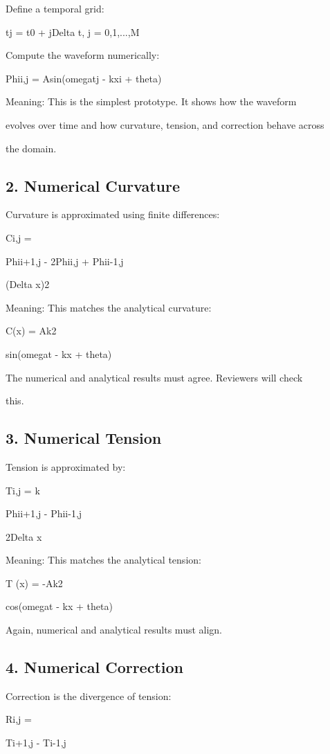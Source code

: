 \documentclass[10pt]{article}
\begin{document}
Define a temporal grid:


tj = t0 + jDelta t, j = 0,1,...,M

Compute the waveform numerically:

Phii,j = Asin(omegatj - kxi + theta)

Meaning: This is the simplest prototype. It shows how the waveform

evolves over time and how curvature, tension, and correction behave across

the domain.

\subsection*{2. Numerical Curvature}
Curvature is approximated using finite differences:

Ci,j =

Phii+1,j - 2Phii,j + Phii-1,j

(Delta x)2

Meaning: This matches the analytical curvature:

C(x) = Ak2

sin(omegat - kx + theta)

The numerical and analytical results must agree. Reviewers will check

this.

\subsection*{3. Numerical Tension}
Tension is approximated by:

Ti,j = k

Phii+1,j - Phii-1,j

2Delta x

Meaning: This matches the analytical tension:

T (x) = -Ak2

cos(omegat - kx + theta)

Again, numerical and analytical results must align.


\subsection*{4. Numerical Correction}
Correction is the divergence of tension:

Ri,j =

Ti+1,j - Ti-1,j
\end{document}
